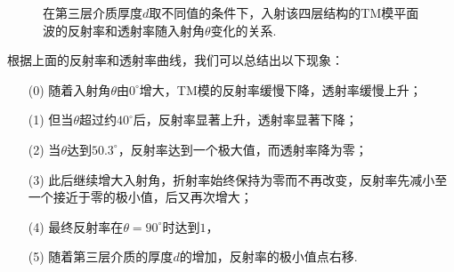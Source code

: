 \documentclass{assignment}
\begin{document}
\begin{sol}
\begin{figure}[H]
{        }
        \caption{在第三层介质厚度$d$取不同值的条件下，入射该四层结构的TM模平面波的反射率和透射率随入射角$\theta$变化的关系.}
        \label{RT-theta}
    \end{figure}

    根据上面的反射率和透射率曲线，我们可以总结出以下现象：
    \begin{itemize}
        \item[(0)] 随着入射角$\theta$由$0^{\circ}$增大，TM模的反射率缓慢下降，透射率缓慢上升；
        \item[(1)] 但当$\theta$超过约$40^{\circ}$后，反射率显著上升，透射率显著下降；
        \item[(2)] 当$\theta$达到$50.3^{\circ}$，反射率达到一个极大值，而透射率降为零；
        \item[(3)] 此后继续增大入射角，折射率始终保持为零而不再改变，反射率先减小至一个接近于零的极小值，后又再次增大；
        \item[(4)] 最终反射率在$\theta=90^{\circ}$时达到$1$，
        \item[(5)] 随着第三层介质的厚度$d$的增加，反射率的极小值点右移.
    \end{itemize}


\end{sol}
\end{document}
